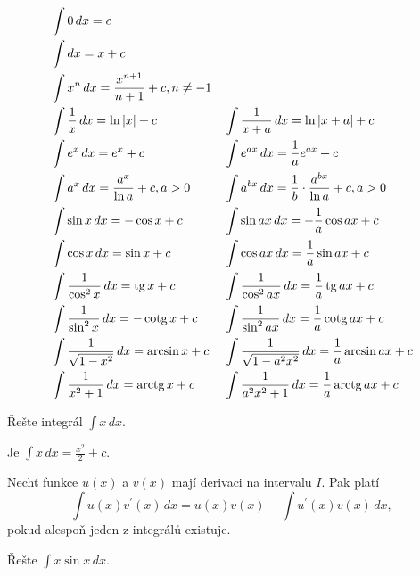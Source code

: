 \begin{pozn}
\begin{align*}
    &\int 0\, dx = c & & \, \\
    &\int dx = x+c & & \, \\
    &\int x^n \, dx = \frac{x^{n+1}}{n+1}+c, n\ne -1 & & \, \\
    &\int \frac{1}{x} \, dx = \operatorname{ln} |x| + c & & \int \frac{1}{x+a}\, dx = \operatorname{ln} |x+a|+c \\
    &\int e^x\, dx = e^x+c & & \int e^{ax}\, dx = \frac{1}{a}e^{ax}+c \\
    &\int a^x \, dx = \frac{a^x}{\operatorname{ln} a} + c, a >0 & & \int a^{bx} \, dx = \frac{1}{b}\cdot \frac{a^{bx}}{\operatorname{ln} a}+c, a>0\\
    &\int \sin x \, dx = -\cos x + c & & \int \sin ax \, dx = -\frac{1}{a}\cos ax+c \\
    &\int \cos x \, dx = \sin x +c & & \int \cos ax\, dx = \frac{1}{a}\sin ax + c \\
    &\int \frac{1}{\cos^2 x}\, dx = \operatorname{tg} x + c & & \int \frac{1}{\cos^2 ax}\, dx=\frac{1}{a}\operatorname{tg} ax+c\\
    &\int \frac{1}{\sin^2 x} \, dx = -\operatorname{cotg} x+c & & \int \frac{1}{\sin^2 ax}\, dx = \frac{1}{a}\operatorname{cotg} ax+c \\
    &\int \frac{1}{\sqrt{1-x^2} }\, dx = \arcsin x + c & & \int \frac{1}{\sqrt{1-a^2x^2} }\, dx = \frac{1}{a}\arcsin ax+c \\
    &\int \frac{1}{x^2+1}\, dx = \operatorname{arctg} x + c & & \int \frac{1}{a^2x^2 + 1}\, dx = \frac{1}{a}\operatorname{arctg} ax + c
\end{align*}
\end{pozn}

\begin{priklad}
Řešte integrál $\int x \, dx.$
\end{priklad}

\begin{reseni}
Je $\int x \, dx=\frac{x^2}{2}+c.$
\end{reseni}

\begin{veta}
Nechť funkce $u(x) $ a $v(x)$ mají derivaci na intervalu $I$. Pak platí
$$\int u(x)v^\prime (x) \, dx = u(x) v(x) - \int u^\prime (x) v(x) \, dx,$$
pokud alespoň jeden z integrálů existuje.
\end{veta}

\begin{priklad}
Řešte $\int x \sin x \, dx $.
\end{priklad}

